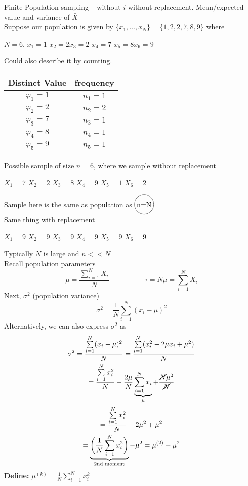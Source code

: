 Finite Population sampling -- without $i$ without replacement. Mean/expected value and variance of $\bar{X}$\\
Suppose our population is given by $\{x_1, \ldots, x_N\} = \{1,2,2,7,8,9 \}$ where
\begin{center}
	$N = 6$, \quad $x_1 = 1$ \quad $x_2 = 2$\quad $x_3 = 2$ \quad $x_4 = 7$ \quad $x_5 = 8$\quad $x_6 = 9$
\end{center}
Could also describe it by counting.
\begin{center}
	\begin{tabular}{c|c}
		Distinct Value & frequency\\
		\hline
		$\varphi_1 = 1$ & $n_1=1$\\
		$\varphi_2 = 2$ & $n_2=2$\\
		$\varphi_3 = 7$ & $n_3=1$\\
		$\varphi_4 = 8$ & $n_4=1$\\
		$\varphi_5 = 9$ & $n_5=1$\\
	\end{tabular}
\end{center}
Possible sample of size $n=6$, where we sample \underline{without replacement}
\begin{center}
	$X_1 = 7$ \quad $X_2 = 2$ \quad $X_3 = 8$ \quad $X_4 = 9$ \quad $X_5 = 1$ \quad $X_6 = 2$ \quad
\end{center}
Sample here is the same as population as $\circled{n=N}$\\
Same thing \underline{with replacement}
\begin{center}
	$X_1 = 9$ \quad $X_2 = 9$ \quad $X_3 = 9$ \quad $X_4 = 9$ \quad $X_5 = 9$ \quad $X_6 = 9$
\end{center}
Typically $N$ is large and $n << N$\\
Recall population parameters
\begin{equation*}
	\mu = \frac{\sum\limits_{i=1}^{N} X_i}{N} \hspace{5em} \tau = N \mu = \sum\limits_{i=1}^N X_i
\end{equation*}
Next, $\sigma^2$ (population variance)
\begin{equation*}
	\sigma^2 = \frac{1}{N} \sum\limits_{i=1}^N(x_i - \mu)^2 \tag{$\sigma^2$ is pop. variance}
\end{equation*}
Alternatively, we can also express $\sigma^2$ as
\begin{gather*}
	\sigma^2 = \frac{\sum\limits_{i=1}^N(x_i - \mu)^2}{N}  = \frac{\sum\limits_{i=1}^N(x_i^2 - 2\mu x_i + \mu^2)}{N}\\
	= \frac{\sum\limits_{i=1}^N x_i^2}{N} - \frac{2\mu}{N} \underbrace{\sum\limits_{i=1}^Nx_i}_{\mu} + \frac{\cancel{N}\mu^2}{\cancel{N}}\\
	= \frac{\sum\limits_{i=1}^N x_i^2}{N} - 2\mu^2 + \mu^2\\
	= \underbrace{\bigg(\frac{1}{N} \sum\limits_{i=1}^N x_i^2 \bigg)}_{\text{2nd moment}} - \mu^2 = \mu^{(2)} - \mu^2
\end{gather*}
\textbf{Define: } $\mu^{(k)} = \frac{1}{N} \sum\limits_{i=1}^N x_i^k$
